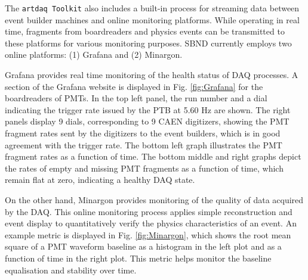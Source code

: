 The \texttt{artdaq Toolkit} also includes a built-in process for streaming data between event builder machines and online monitoring platforms.
While operating in real time, fragments from boardreaders and physics events can be transmitted to these platforms for various monitoring purposes. 
SBND currently employs two online platforms: (1) Grafana and (2) Minargon.

Grafana provides real time monitoring of the health status of DAQ processes. 
A section of the Grafana website is displayed in Fig. \ref{fig:Grafana} for the boardreaders of PMTs.
In the top left panel, the run number and a dial indicating the trigger rate issued by the PTB at 5.60 Hz are shown. 
The right panels display 9 dials, corresponding to 9 CAEN digitizers, showing the PMT fragment rates sent by the digitizers to the event builders, which is in good agreement with the trigger rate.
The bottom left graph illustrates the PMT fragment rates as a function of time. 
The bottom middle and right graphs depict the rates of empty and missing PMT fragments as a function of time, which remain flat at zero, indicating a healthy DAQ state.

On the other hand, Minargon provides monitoring of the quality of data acquired by the DAQ. 
This online monitoring process applies simple reconstruction and event display to quantitatively verify the physics characteristics of an event. 
An example metric is displayed in Fig. \ref{fig:Minargon}, which shows the root mean square of a PMT waveform baseline as a histogram in the left plot and as a function of time in the right plot.
This metric helps monitor the baseline equalisation and stability over time.

